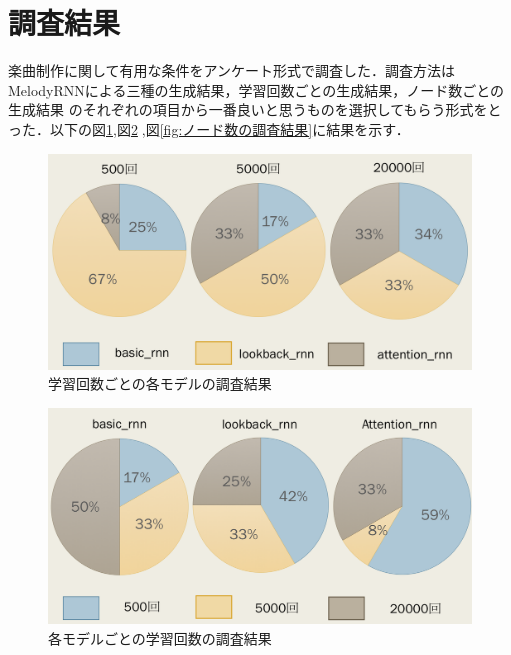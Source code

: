 \section{調査結果}
楽曲制作に関して有用な条件をアンケート形式で調査した．調査方法はMelodyRNNによる三種の生成結果，学習回数ごとの生成結果，ノード数ごとの生成結果
のそれぞれの項目から一番良いと思うものを選択してもらう形式をとった．以下の図\ref{fig:学習回数ごと各モデルの調査結果},図\ref{fig:各モデルごとの学習回数の調査結果},図\ref{fig:ノード数の調査結果}に結果を示す．\\
\begin{figure}[h]
    \begin{screen}
    \begin{center}
        \includegraphics[scale=0.6, clip]{./img/glaph1.png}
        \caption{学習回数ごとの各モデルの調査結果}
        \label{fig:学習回数ごと各モデルの調査結果}
    \end{center}
    \end{screen}
\end{figure}
\begin{figure}[h]
    \begin{screen}
    \begin{center}
        \includegraphics[scale=0.6, clip]{./img/glaph2.png}
        \caption{各モデルごとの学習回数の調査結果}
        \label{fig:各モデルごとの学習回数の調査結果}
    \end{center}
    \end{screen}
\end{figure}
